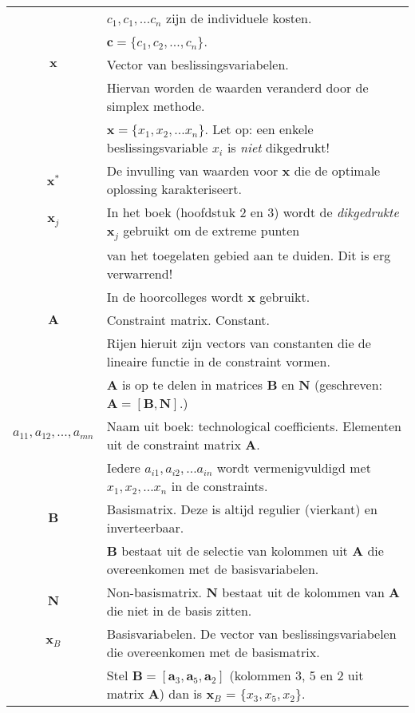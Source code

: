 \documentclass[10pt,a4paper]{article}
\begin{document}
\begin{tabular}{|c|l|}
 & $c_1, c_1, ... c_n$ zijn de individuele kosten. \\ & $\textbf{c} = \{c_1, c_2, ..., c_n\}$. \\ 
\hline 
$\textbf{x}$ & Vector van beslissingsvariabelen. \\ & Hiervan worden de waarden veranderd door de simplex methode. \\ & $\textbf{x} = \{x_1, x_2, ... x_n\}$. Let op: een enkele beslissingsvariable $x_i$ is \textit{niet} dikgedrukt! \\
\hline
$\textbf{x}^*$ & De invulling van waarden voor $\textbf{x}$ die de optimale oplossing karakteriseert. \\ %
\hline
$\textbf{x}_j$ & In het boek (hoofdstuk 2 en 3) wordt de \textit{dikgedrukte} $\textbf{x}_j$ gebruikt om de extreme punten \\ 
 & van het toegelaten gebied aan te duiden. Dit is erg verwarrend! \\
 & In de hoorcolleges wordt $\textbf{\^x}$ gebruikt. \\
\hline
$\textbf{A}$ & Constraint matrix. Constant. \\ 
 & Rijen hieruit zijn vectors van constanten die de lineaire functie in de constraint vormen. \\
 & $\textbf{A}$ is op te delen in matrices $\textbf{B}$ en $\textbf{N}$ (geschreven: $\textbf{A} = [\textbf{B}, \textbf{N}]$.) \\ %
\hline
$a_{11}, a_{12}, ..., a_{mn}$ & Naam uit boek: technological coefficients. Elementen uit de constraint matrix $\textbf{A}$.\\
& Iedere $a_{i1}, a_{i2}, ... a_{in}$ wordt vermenigvuldigd met $x_1, x_2, ... x_n$ in de constraints. \\
\hline
$\textbf{B}$ & Basismatrix. Deze is altijd regulier (vierkant) en inverteerbaar. \\ %
& $\textbf{B}$ bestaat uit de selectie van kolommen uit $\textbf{A}$ die overeenkomen met de basisvariabelen.  \\
\hline
$\textbf{N}$ & Non-basismatrix. $\textbf{N}$ bestaat uit de kolommen van $\textbf{A}$ die niet in de basis zitten. \\
\hline
$\textbf{x}_B$ & Basisvariabelen. De vector van beslissingsvariabelen die overeenkomen met de basismatrix. \\
& Stel $\textbf{B} = [\textbf{a}_3, \textbf{a}_5, \textbf{a}_2]$ (kolommen 3, 5 en 2 uit matrix $\textbf{A}$) dan is $\textbf{x}_B$ = $\{x_3, x_5, x_2\}$. \\

\end{tabular}
\end{document}
